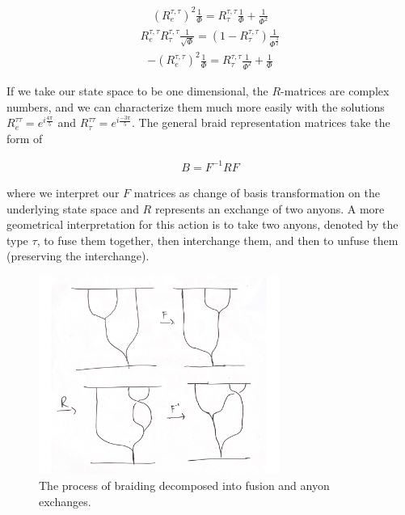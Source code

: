 \documentclass[10pt]{ucthesis}
\begin{document}
\begin{equation}
	\begin{aligned}
		(R^{\tau,\tau}_e)^2\frac{1}{\Phi} = R^{\tau,\tau}_\tau\frac{1}{\Phi} + \frac{1}{\Phi^2}
	\end{aligned}
\end{equation}
\begin{equation}
	\begin{aligned}
		R^{\tau,\tau}_eR^{\tau,\tau}_\tau\frac{1}{\sqrt{\Phi}} = (1-R^{\tau,\tau}_\tau)\frac{1}{\Phi^\frac{3}{2}} 
	\end{aligned}
\end{equation}
\begin{equation}
	\begin{aligned}
		-(R^{\tau,\tau}_e)^2\frac{1}{\Phi} = R^{\tau,\tau}_\tau\frac{1}{\Phi^2}+\frac{1}{\Phi}
	\end{aligned}
\end{equation}

If we take our state space to be one dimensional, the $R$-matrices are complex numbers, and we can characterize them much more easily with the solutions $R^{\tau\tau}_e = e^{i\frac{4\pi}{5}}$ and $R^{\tau\tau}_\tau = e^{i\frac{-3\pi}{5}}$. The general braid representation matrices take the form of 

\begin{equation}
	\begin{aligned}
		B = F^{-1}R F
	\end{aligned}
\end{equation}

where we interpret our $F$ matrices as change of basis transformation on the underlying state space and $R$ represents an exchange of two anyons. A more geometrical interpretation for this action is to take two anyons, denoted by the type $\tau$, to fuse them together, then interchange them, and then to unfuse them (preserving the interchange). 

\begin{figure}[H]
	\centering
	\includegraphics[width=0.7\textwidth]{braid.png}
	\caption{The process of braiding decomposed into fusion and anyon exchanges.}
\end{figure}
\end{document}
